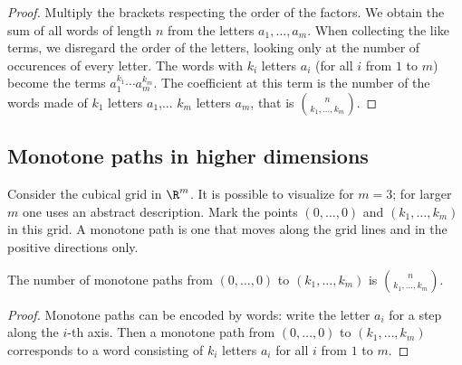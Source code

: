 \begin{page}

\begin{proof}
Multiply the brackets respecting the order of the factors.
We obtain the sum of all words of length $n$ from the letters $a_1, \ldots, a_m$.
When collecting the like terms, we disregard the order of the letters, looking only at the number of occurences of every letter.
The words with $k_i$ letters $a_i$ (for all $i$ from $1$ to $m$) become the terms $a_1^{k_1} \cdots a_m^{k_m}$.
The coefficient at this term is the number of the words made of $k_1$ letters $a_1$,... $k_m$ letters $a_m$,
that is $\binom{n}{k_1, \ldots, k_m}$.
\end{proof}



\end{page}

\begin{page}

\subsection{Monotone paths in higher dimensions}
Consider the cubical grid in $\R^m$.
It is possible to visualize for $m=3$; for larger $m$ one uses an abstract description.
Mark the points $(0, \ldots, 0)$ and $(k_1, \ldots, k_m)$ in this grid.
A monotone path is one that moves along the grid lines and in the positive directions only.


\end{page}

\begin{page}

\begin{thm}
The number of monotone paths from $(0, \ldots, 0)$ to $(k_1, \ldots, k_m)$ is $\binom{n}{k_1, \ldots, k_m}$.
\end{thm}

\end{page}

\begin{page}

\begin{proof}
Monotone paths can be encoded by words: write the letter $a_i$ for a step along the $i$-th axis.
Then a monotone path from $(0, \ldots, 0)$ to $(k_1, \ldots, k_m)$ corresponds to a word
consisting of $k_i$ letters $a_i$ for all $i$ from $1$ to $m$.
\end{proof}




\end{page}

